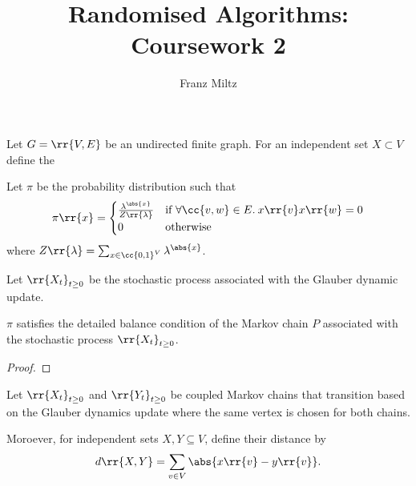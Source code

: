 \documentclass{article}
\title{Randomised Algorithms: Coursework 2}
\author{Franz Miltz}
\begin{document}
\maketitle

Let $G=\rr{V,E}$ be an undirected finite graph.
For an independent set $X\subset V$ define the 


Let $\pi$ be the probability distribution such that
\begin{align*}
  \pi\rr{x}=
  \begin{cases}
    \frac{\lambda^{\abs{x}}}{Z\rr{\lambda}} &\text{if }\forall \cc{v,w}\in E.\:x\rr{v}x\rr{w}=0 \\
    0 &\text{otherwise}
  \end{cases}
\end{align*}
where $Z\rr{\lambda}=\sum_{x\in\cc{0,1}^V} \lambda^{\abs{x}}$.

Let $\rr{X_t}_{t\geq 0}$ be the stochastic process associated with the Glauber dynamic
update.

\begin{claim*}[1]

\end{claim*}

\begin{claim*}[2]
  $\pi$ satisfies the detailed balance condition of the Markov chain $P$ associated
  with the stochastic process $\rr{X_t}_{t\geq 0}$.
  \begin{proof}

  \end{proof}
\end{claim*}

Let $\rr{X_t}_{t\geq 0}$ and $\rr{Y_t}_{t\geq 0}$ be coupled Markov chains that transition
based on the Glauber dynamics update where the same vertex is chosen for both chains.

Moroever, for independent sets $X,Y\subseteq V$, define their distance by
\begin{align*}
  d\rr{X,Y} = \sum_{v\in V} \abs{x\rr{v}-y\rr{v}}.
\end{align*}

\begin{claim*}[3]
\end{claim*}
\end{document}
